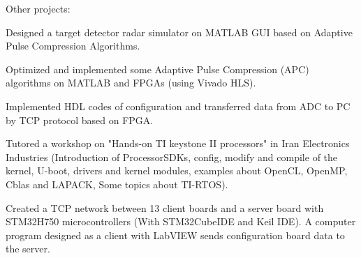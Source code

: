 \newpage
{}


\begin{cventries}

  \cventry
    {} %
    {Other projects:} %
    {} %
    {} %
    {
      \begin{cvitems} %
        \item {Designed a target detector radar simulator on MATLAB GUI based on Adaptive Pulse Compression Algorithms.}
        \item {Optimized and implemented some Adaptive Pulse Compression (APC) algorithms on MATLAB and FPGAs (using Vivado HLS).}
	\item {Implemented HDL codes of configuration and transferred data from ADC to PC by TCP protocol based on FPGA.}
	\item {Tutored a workshop on "Hands-on TI keystone II processors" in Iran Electronics Industries (Introduction of ProcessorSDKs, config, modify and compile of the kernel, U-boot, drivers and kernel modules, examples about OpenCL, OpenMP, Cblas and LAPACK, Some topics about TI-RTOS).}
	\item {Created a TCP network between 13 client boards and a server board with STM32H750 microcontrollers (With STM32CubeIDE and Keil IDE). A computer program designed as a client with LabVIEW sends configuration board data to the server.}
      \end{cvitems}
    }

\end{cventries}
